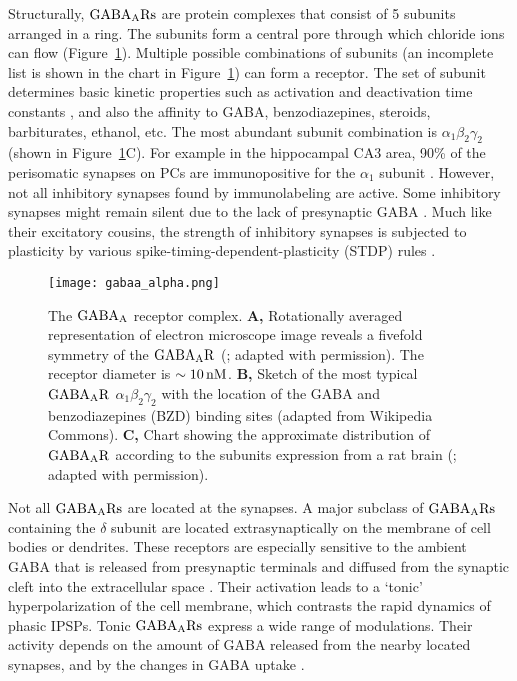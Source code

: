       Structurally, $\rm GABA_ARs$ are protein complexes that consist of 5
      subunits arranged in a ring. The subunits form a central pore through
      which chloride ions can flow (Figure~\ref{fig:gabaa}). Multiple possible
      combinations of subunits (an incomplete list is shown in the chart in
      Figure~\ref{fig:gabaa}) can form a receptor. The set of subunit
      determines basic kinetic properties such as activation and deactivation
      time constants \citep{Benkwitz2004, Boileau2005}, and also the affinity
      to GABA, benzodiazepines, steroids, barbiturates, ethanol, etc. The most
      abundant subunit combination is $\alpha_1 \beta_2 \gamma_2$ (shown in
      Figure~\ref{fig:gabaa}C). For example in the hippocampal CA3 area, 90\%
      of the perisomatic synapses on PCs are immunopositive for the $\alpha_1$
      subunit \citep{Kerti2016}. However, not all inhibitory synapses found by
      immunolabeling are active. Some inhibitory synapses might remain silent
      due to the lack of presynaptic GABA \citep{Bekkers2005}. Much like their
      excitatory cousins, the strength of inhibitory synapses is subjected to
      plasticity by various spike-timing-dependent-plasticity (STDP) rules
      \citep{Vogels2013}.

      \begin{figure}
        \center
        \texttt{[image: gabaa\_alpha.png]}
        \caption{
          The $\rm GABA_A$ receptor complex.
          {\bf A,} Rotationally averaged representation of electron microscope
          image reveals a fivefold symmetry of the $\rm GABA_AR$
          (\citealp{Nayeem1994}; adapted with permission). The receptor
          diameter is $\sim 10\,\rm nM$.
          {\bf B,} Sketch of the most typical $\rm GABA_AR$ $\alpha_1
          \beta_2 \gamma_2$ with the location of the GABA and benzodiazepines
          (BZD) binding sites (adapted from Wikipedia Commons).
          {\bf C,} Chart showing the approximate distribution of $\rm
          GABA_AR$ according to the subunits expression from a rat brain
          (\citealp{Whiting2003}; adapted with permission).
               }
      \label{fig:gabaa}
      \end{figure}
      
      Not all $\rm GABA_ARs$ are located at the synapses. A major subclass of
      $\rm GABA_ARs$ containing the $\delta$ subunit are located
      extrasynaptically on the membrane of cell bodies or dendrites. These
      receptors are especially sensitive to the ambient GABA that is released
      from presynaptic terminals and diffused from the synaptic cleft into the
      extracellular space \citep{Semyanov2004, Farrant2005}. Their activation
      leads to a `tonic' hyperpolarization of the cell membrane, which
      contrasts the rapid dynamics of phasic IPSPs. Tonic $\rm GABA_A Rs$
      express a wide range of modulations. Their activity depends on the amount
      of GABA released from the nearby located synapses, and by the changes in
      GABA uptake \citep{Farrant2005}.

